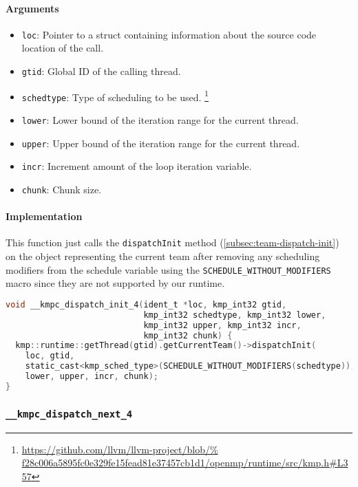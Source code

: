 \paragraph{Arguments}
\begin{itemize}
	\item \texttt{loc}: Pointer to a struct containing information about the source code location
	      of the call.
	\item \texttt{gtid}: Global ID of the calling thread.
	\item \texttt{schedtype}: Type of scheduling to be used.
	      \footnote{\url{
			      https://github.com/llvm/llvm-project/blob/%
			      f28c006a5895fc0e329fe15fead81e37457cb1d1/openmp/runtime/src/kmp.h\#L357}}
	\item \texttt{lower}: Lower bound of the iteration range for the current thread.
	\item \texttt{upper}: Upper bound of the iteration range for the current thread.
	\item \texttt{incr}: Increment amount of the loop iteration variable.
	\item \texttt{chunk}: Chunk size.
\end{itemize}

\paragraph{Implementation} This function just calls the \texttt{dispatchInit} method
(\cref{subsec:team-dispatch-init}) on the object representing the current team after removing any
scheduling modifiers from the schedule variable using the \texttt{SCHEDULE\_WITHOUT\_MODIFIERS}
macro since they are not supported by our runtime.

\begin{lstlisting}[language=C, caption={__kmpc_dispatch_init_4},
                   label={lst:kmpc-dispatch-init-4}, escapechar=@]
void __kmpc_dispatch_init_4(ident_t *loc, kmp_int32 gtid,
                            kmp_int32 schedtype, kmp_int32 lower,
                            kmp_int32 upper, kmp_int32 incr,
                            kmp_int32 chunk) {
  kmp::runtime::getThread(gtid).getCurrentTeam()->dispatchInit(
    loc, gtid,
    static_cast<kmp_sched_type>(SCHEDULE_WITHOUT_MODIFIERS(schedtype)),
    lower, upper, incr, chunk);
}
\end{lstlisting}

\subsubsection{\texttt{__kmpc_dispatch_next_4}}
\label{subsubsec:kmpc-dispatch-next-4}

